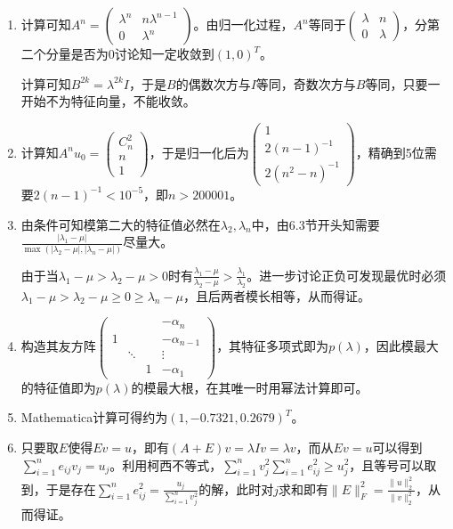 \documentclass[a4paper,UTF8,fontset=windows]{ctexart}
\begin{document}
\begin{enumerate}
\item
计算可知$A^n=\begin{pmatrix}\lambda^n&n\lambda^{n-1}\\0&\lambda^n\end{pmatrix}$。由归一化过程，$A^n$等同于$\begin{pmatrix}\lambda&n\\0&\lambda\end{pmatrix}$，分第二个分量是否为0讨论知一定收敛到$(1,0)^T$。

计算可知$B^{2k}=\lambda^{2k}I$，于是$B$的偶数次方与$I$等同，奇数次方与$B$等同，只要一开始不为特征向量，不能收敛。

\item
计算知$A^nu_0=\begin{pmatrix}C_n^2\\n\\1\end{pmatrix}$，于是归一化后为$\begin{pmatrix}1\\2(n-1)^{-1}\\2(n^2-n)^{-1}\end{pmatrix}$，精确到5位需要$2(n-1)^{-1}<10^{-5}$，即$n>200001$。

\item
由条件可知模第二大的特征值必然在$\lambda_2,\lambda_n$中，由6.3节开头知需要$\frac{|\lambda_1-\mu|}{\max(|\lambda_2-\mu|,|\lambda_n-\mu|)}$尽量大。

由于当$\lambda_1-\mu>\lambda_2-\mu>0$时有$\frac{\lambda_1-\mu}{\lambda_2-\mu}>\frac{\lambda_1}{\lambda_2}$。进一步讨论正负可发现最优时必须$\lambda_1-\mu>\lambda_2-\mu\ge0\ge\lambda_n-\mu$，且后两者模长相等，从而得证。

\item
构造其友方阵$\begin{pmatrix}&&&-\alpha_n\\1&&&-\alpha_{n-1}\\ &\ddots&&\vdots\\ &&1&-\alpha_1\end{pmatrix}$，其特征多项式即为$p(\lambda)$，因此模最大的特征值即为$p(\lambda)$的模最大根，在其唯一时用幂法计算即可。

\item
Mathematica计算可得约为$(1, -0.7321, 0.2679)^T$。

\item
只要取$E$使得$Ev=u$，即有$(A+E)v=\lambda Iv=\lambda v$，而从$Ev=u$可以得到$\sum_{i=1}^ne_{ij}v_j=u_j$。利用柯西不等式，$\sum_{i=1}^nv_j^2\sum_{i=1}^ne_{ij}^2\ge u_j^2$，且等号可以取到，于是存在$\sum_{i=1}^ne_{ij}^2=\frac{u_j}{\sum_{i=1}^nv_j^2}$的解，此时对$j$求和即有$\|E\|_F^2=\frac{\|u\|_2^2}{\|v\|_2^2}$，从而得证。


\end{enumerate}
\end{document}
